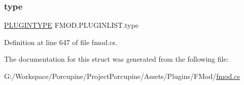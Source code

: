 \mbox{\label{struct_f_m_o_d_1_1_p_l_u_g_i_n_l_i_s_t_a4d1c97508aafa26b0e31cd25063830c7}} 
\subsubsection{\texorpdfstring{type}{type}}
{\footnotesize\ttfamily \hyperlink{namespace_f_m_o_d_ad838bca9e846c3461c840ea9865dfcea}{P\+L\+U\+G\+I\+N\+T\+Y\+PE} F\+M\+O\+D.\+P\+L\+U\+G\+I\+N\+L\+I\+S\+T.\+type}



Definition at line 647 of file fmod.\+cs.



The documentation for this struct was generated from the following file\+:\begin{DoxyCompactItemize}
\item 
G\+:/\+Workspace/\+Porcupine/\+Project\+Porcupine/\+Assets/\+Plugins/\+F\+Mod/\hyperlink{fmod_8cs}{fmod.\+cs}\end{DoxyCompactItemize}
